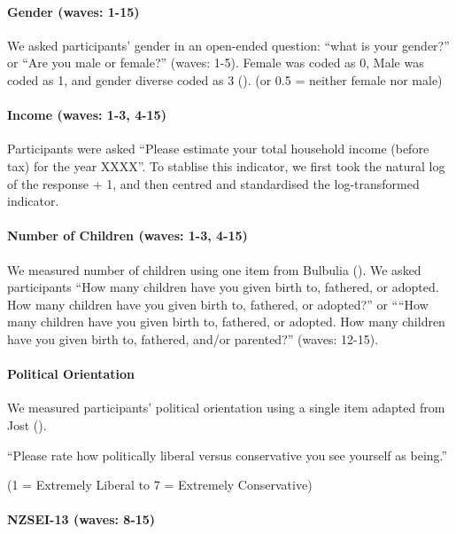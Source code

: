 \documentclass[
  singlecolumn]{article}
\let\oldparagraph\paragraph
\renewcommand{\paragraph}[1]{\oldparagraph{#1}\mbox{}}
\begin{document}
\paragraph{Gender (waves: 1-15)}\label{gender-waves-1-15}

We asked participants' gender in an open-ended question: ``what is your
gender?'' or ``Are you male or female?'' (waves: 1-5). Female was coded
as 0, Male was coded as 1, and gender diverse coded as 3
(). (or 0.5
= neither female nor male)

\paragraph{Income (waves: 1-3, 4-15)}\label{income-waves-1-3-4-15}

Participants were asked ``Please estimate your total household income
(before tax) for the year XXXX''. To stablise this indicator, we first
took the natural log of the response + 1, and then centred and
standardised the log-transformed indicator.

\paragraph{Number of Children (waves: 1-3,
4-15)}\label{number-of-children-waves-1-3-4-15}

We measured number of children using one item from Bulbulia
(). We asked participants ``How many
children have you given birth to, fathered, or adopted. How many
children have you given birth to, fathered, or adopted?'' or ````How
many children have you given birth to, fathered, or adopted. How many
children have you given birth to, fathered, and/or parented?'' (waves:
12-15).

\paragraph{Political Orientation}\label{political-orientation}

We measured participants' political orientation using a single item
adapted from Jost ().

``Please rate how politically liberal versus conservative you see
yourself as being.''

(1 = Extremely Liberal to 7 = Extremely Conservative)

\paragraph{NZSEI-13 (waves: 8-15)}\label{nzsei-13-waves-8-15}
\end{document}
